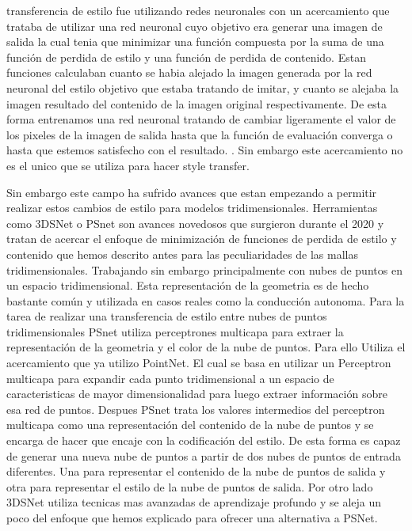 transferencia de estilo fue utilizando redes neuronales con un acercamiento que trataba de utilizar una red neuronal cuyo objetivo era generar una imagen de salida
la cual tenia que minimizar una función compuesta por la suma de una función de perdida de estilo y una función de perdida de contenido. Estan funciones calculaban cuanto se habia alejado la imagen generada por la red neuronal
del estilo objetivo que estaba tratando de imitar, y cuanto se alejaba la imagen resultado del contenido de la imagen original respectivamente. De esta forma entrenamos una red neuronal tratando de cambiar ligeramente el valor de los
pixeles de la imagen de salida hasta que la función de evaluación converga o hasta que estemos satisfecho con el resultado. \cite{Gatys_2016_CVPR}. Sin embargo este acercamiento no es el unico que se utiliza para hacer style transfer.

Sin embargo este campo ha sufrido avances que estan empezando a permitir realizar estos cambios de estilo para modelos tridimensionales. Herramientas como 3DSNet \cite{segu20203dsnet} o PSnet \cite{Cao_2020_WACV} son avances novedosos que surgieron
durante el 2020 y tratan de acercar el enfoque de minimización de funciones de perdida de estilo y contenido que hemos descrito antes para las peculiaridades de las mallas tridimensionales. Trabajando sin embargo principalmente con nubes de puntos en
un espacio tridimensional. Esta representación de la geometria es de hecho bastante común y utilizada en casos reales como la conducción autonoma. Para la tarea de realizar una transferencia de estilo entre nubes de puntos tridimensionales PSnet utiliza
perceptrones multicapa para extraer la representación de la geometria y el color de la nube de puntos. Para ello Utiliza el acercamiento que ya utilizo PointNet\cite{PointNet}. El cual se basa en utilizar un Perceptron multicapa para expandir cada punto tridimensional a un espacio de caracteristicas
de mayor dimensionalidad para luego extraer información sobre esa red de puntos. Despues PSnet trata los valores intermedios del perceptron multicapa como una representación del contenido de la nube de puntos y se encarga de hacer que encaje con la codificación del estilo. De esta forma es capaz de generar una nueva
nube de puntos a partir de dos nubes de puntos de entrada diferentes. Una para representar el contenido de la nube de puntos de salida y otra para representar el estilo de la nube de puntos de salida. Por otro lado 3DSNet utiliza tecnicas mas avanzadas de aprendizaje profundo y se aleja un poco del enfoque que hemos explicado 
para ofrecer una alternativa a PSNet.

